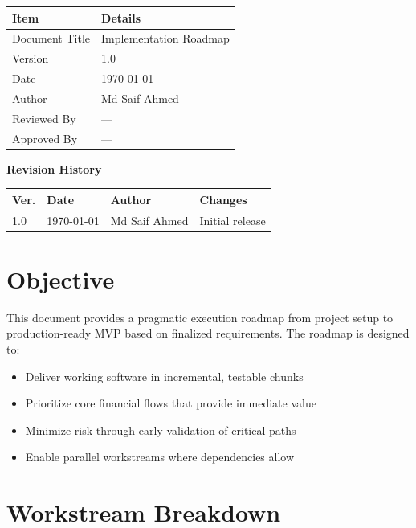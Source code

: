\documentclass[11pt,a4paper]{article}
\newcommand{\DocumentTitle}{Implementation Roadmap}
\newcommand{\DocumentVersion}{1.0}
\newcommand{\DocumentDate}{\today}
\begin{document}
\begin{tabular}{@{}p{3cm}p{10cm}@{}}
\toprule
\textbf{Item} & \textbf{Details} \\
\midrule
Document Title & \DocumentTitle \\
Version & \DocumentVersion \\
Date & \DocumentDate \\
Author & Md Saif Ahmed \\
Reviewed By & --- \\
Approved By & --- \\
\bottomrule
\end{tabular}

\vspace{1em}

\textbf{Revision History}

\begin{tabular}{@{}p{1.2cm}p{2.5cm}p{3.5cm}p{5.5cm}@{}}
\toprule
\textbf{Ver.} & \textbf{Date} & \textbf{Author} & \textbf{Changes} \\
\midrule
1.0 & \DocumentDate & Md Saif Ahmed & Initial release \\
\bottomrule
\end{tabular}

\newpage

\section{Objective}

This document provides a pragmatic execution roadmap from project setup to production-ready MVP based on finalized requirements. The roadmap is designed to:

\begin{itemize}
    \item Deliver working software in incremental, testable chunks
    \item Prioritize core financial flows that provide immediate value
    \item Minimize risk through early validation of critical paths
    \item Enable parallel workstreams where dependencies allow
\end{itemize}

\section{Workstream Breakdown}
\end{document}
